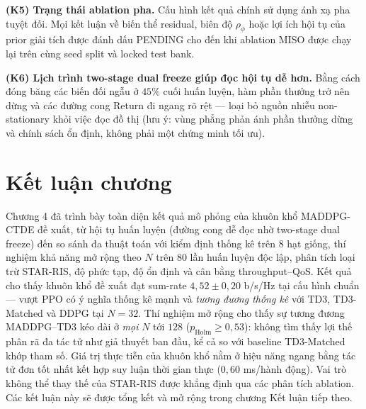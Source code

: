 \textbf{(K5) Trạng thái ablation pha.} Cấu hình kết quả chính sử dụng
ánh xạ pha tuyệt đối. Mọi kết luận về biến thể residual, biên độ
$\rho_{\phi}$ hoặc lợi ích hội tụ của prior giải tích được đánh dấu PENDING
cho đến khi ablation MISO được chạy lại trên cùng seed split và locked test
bank.

\textbf{(K6) Lịch trình two-stage dual freeze giúp đọc hội tụ dễ hơn.}
Bằng cách đóng băng các biến đối ngẫu ở $45\%$ cuối huấn luyện, hàm
phần thưởng trở nên dừng và các đường cong Return đi ngang rõ rệt ---
loại bỏ nguồn nhiễu non-stationary khỏi việc đọc đồ thị (lưu ý: vùng
phẳng phản ánh phần thưởng dừng và chính sách ổn định, không phải một
chứng minh tối ưu).

\section*{Kết luận chương}

Chương 4 đã trình bày toàn diện kết quả mô phỏng của khuôn khổ
MADDPG-CTDE đề xuất, từ hội tụ huấn luyện (đường cong dễ đọc nhờ
two-stage dual freeze) đến so sánh đa thuật toán với kiểm định thống
kê trên $8$ hạt giống, thí nghiệm khả năng mở rộng theo $N$ trên
$80$ lần huấn luyện độc lập, phân tích loại trừ STAR-RIS, độ phức
tạp, độ ổn định và cân bằng throughput--QoS. Kết quả cho thấy khuôn
khổ đề xuất đạt sum-rate $4{,}52 \pm 0{,}20$ b/s/Hz tại cấu hình chuẩn
--- vượt PPO có ý nghĩa thống kê mạnh và \emph{tương đương thống kê}
với TD3, TD3-Matched và DDPG tại $N=32$. Thí nghiệm mở rộng cho thấy
sự tương đương MADDPG--TD3 kéo dài ở \emph{mọi} $N$ tới $128$
($p_{\text{Holm}} \geq 0{,}53$): không tìm thấy lợi thế phân rã đa tác
tử như giả thuyết ban đầu, kể cả so với baseline TD3-Matched khớp tham
số. Giá trị thực tiễn của khuôn khổ nằm ở hiệu năng ngang bằng tác tử
đơn tốt nhất kết hợp suy luận thời gian thực ($0{,}60$ ms/hành động).
Vai trò không thể thay thế của STAR-RIS được khẳng định qua các phân
tích ablation. Các kết luận này sẽ được tổng kết và mở rộng trong
chương Kết luận tiếp theo.
